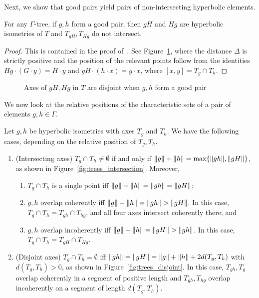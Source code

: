 Next, we show that good pairs yield pairs of non-intersecting
hyperbolic elements.

\begin{lemma}
  For any $\Gamma$-tree, if $g,h$ form a good pair, then $gH$ and $Hg$ are hyperbolic isometries of $T$ and $T_{gH}, T_{Hg}$ do not intersect.
    \label{lem:oppgoodpair}
\end{lemma}
\begin{proof}
  This is contained in the proof
  of~\cite[Lemma~3.4]{CM87:GroupActions}. See
  Figure~\ref{fig:trees_goodpair}, where the distance $\Delta$ is
  strictly positive and the position of the relevant points follow
  from the identities $Hg \cdot (G \cdot y) = H \cdot y$ and
  $gH \cdot (h \cdot x) = g \cdot x$, where $[x,y] = T_g \cap T_h$.
\end{proof}

\begin{figure}[ht]
     \centering
{}
    \caption{Axes of $gH, Hg$ in $T$ are disjoint when $g,h$ form a good pair}\label{fig:trees_goodpair}
\end{figure}

We now look at the relative positions of the characteristic sets of a pair of elements $g,h \in \Gamma$. 

\begin{lemma}
\label{lem:foundation_trees}
Let $g,h$ be hyperbolic isometries with axes $T_g$ and $T_h$.
We have the following cases, depending on the relative position of $T_g,T_h$.
\begin{enumerate}[(\arabic*)]
\item \label{item:tree-intersect}(Intersecting axes)
$T_g \cap T_h \neq \emptyset$ if and only if $\lVert g \rVert + \lVert h \rVert =\max \{ \lVert gh \rVert , \lVert gH\rVert \}$, as shown in Figure~\ref{fig:trees_intersection}.
Moreover,
\begin{enumerate}
\item $T_g \cap T_h$ is a single point iff $\lVert  g \rVert + \lVert h \rVert = \lVert gh\rVert = \lVert gH\rVert$;
\item $g,h$ overlap coherently iff 
  $\lVert g \rVert + \lVert h \rVert = \lVert gh \rVert >\lVert gH\rVert$. In this case,
  $T_g \cap
T_h = T_{gh} \cap T_{hg}$, and all four axes intersect coherently there; and
\item $g,h$ overlap incoherently iff 
$\lVert g \rVert + \lVert h \rVert = \lVert gH \rVert >\lVert gh\rVert$. In this case, $T_g \cap T_h = T_{gH} \cap T_{Hg}$.
\end{enumerate}
\item \label{item:tree-disjoint}(Disjoint axes) $T_g \cap T_h =\emptyset$ iff $\lVert gh\rVert=\lVert gH\rVert=\lVert g\rVert+\lVert h\rVert+2d(T_g,T_h)$ with $d(T_g,T_h)>0$,
as shown in Figure~\ref{fig:trees_disjoint}.
In this case, $T_{gh}, T_g$ overlap coherently
in a segment of positive length and
$T_{gh},T_{hg}$ overlap incoherently on a segment of length
$d(T_g, T_h)$.
\end{enumerate}
\end{lemma}

